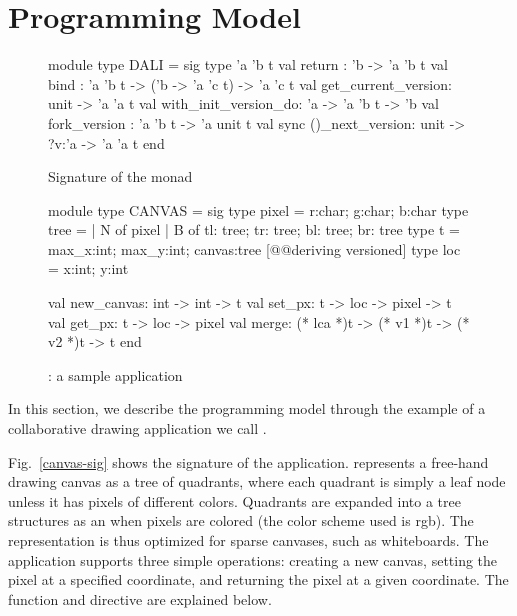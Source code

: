 \section{Programming Model}

\begin{figure}

  \begin{ocaml}
  module type DALI = sig
    type 'a 'b t
    val return : 'b -> 'a 'b t
    val bind : 'a 'b t -> ('b -> 'a 'c t) -> 'a 'c t
    val get_current_version: unit -> 'a 'a t
    val with_init_version_do: 'a -> 'a 'b t -> 'b
    val fork_version : 'a 'b t -> 'a unit t
    val sync ()_next_version: unit -> ?v:'a -> 'a 'a t
  end
  \end{ocaml}

\label{fig:dali-monad}
\caption{Signature of the \name monad}
\end{figure}

\begin{figure}

  \begin{ocaml}
  module type CANVAS = sig
    type pixel = {r:char; g:char; b:char}
    type tree = 
      | N of pixel
      | B of {tl: tree; tr: tree; bl: tree; br: tree} 
    type t = {max_x:int; max_y:int; canvas:tree} [@@deriving versioned]
    type loc = {x:int; y:int}
  
    val new_canvas: int -> int -> t
    val set_px: t -> loc -> pixel -> t
    val get_px: t -> loc -> pixel
    val merge: (* lca *)t -> (* v1 *)t -> (* v2 *)t -> t
  end
  \end{ocaml}

\label{fig:canvas-sig}
\caption{\drawsome: a sample \name application}
\end{figure}

In this section, we describe the \name programming model through the
example of a collaborative drawing application we call \drawsome.

Fig.~\ref{canvas-sig} shows the signature of the \drawsome
application. \drawsome represents a free-hand drawing canvas as a tree
of quadrants, where each quadrant is simply a leaf node unless it has
pixels of different colors. Quadrants are expanded into a tree
structures as an when pixels are colored (the color scheme used is
rgb). The representation is thus optimized for sparse canvases, such
as whiteboards. The application supports three simple operations:
creating a new canvas, setting the pixel at a specified coordinate,
and returning the pixel at a given coordinate. The  function
and  directive are explained below.

